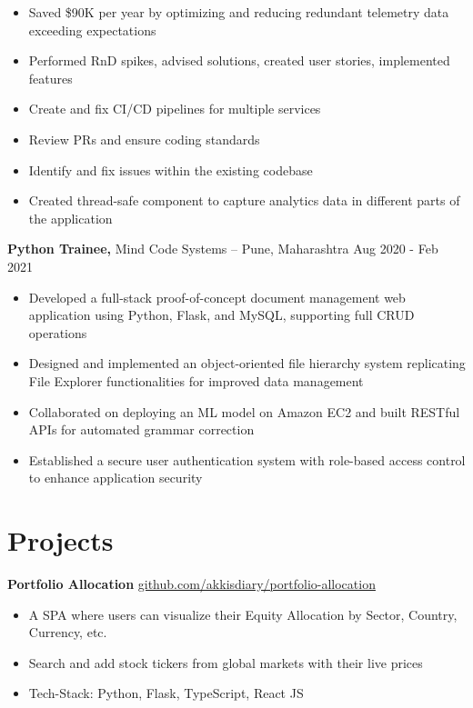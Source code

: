 \documentclass[11pt]{article}       %
\begin{document}
\begin{itemize}
  \item Saved \$90K per year by optimizing and reducing redundant telemetry data exceeding expectations \\
  \item Performed RnD spikes, advised solutions, created user stories, implemented features \\
  \item Create and fix CI/CD pipelines for multiple services \\
  \item Review PRs and ensure coding standards \\
  \item Identify and fix issues within the existing codebase \\
  \item Created thread-safe component to capture analytics data in different parts of the application \\
\end{itemize}

\textbf{Python Trainee,} {Mind Code Systems} -- Pune, Maharashtra \hfill Aug 2020 - Feb 2021 \\
\vspace{-9pt}
\begin{itemize}
  \item Developed a full-stack proof-of-concept document management web application using Python, Flask, and MySQL, supporting full CRUD operations
  \item Designed and implemented an object-oriented file hierarchy system replicating File Explorer functionalities for improved data management
  \item Collaborated on deploying an ML model on Amazon EC2 and built RESTful APIs for automated grammar correction
  \item Established a secure user authentication system with role-based access control to enhance application security
\end{itemize}

\vspace{-18.5pt}

\section*{Projects}
\textbf{Portfolio Allocation} \hfill \href{https://github.com/Akkisdiary/portfolio-allocation}{github.com/akkisdiary/portfolio-allocation} \\
\vspace{-9pt}
\begin{itemize}
  \item A SPA where users can visualize their Equity Allocation by Sector, Country, Currency, etc.
  \item Search and add stock tickers from global markets with their live prices
  \item Tech-Stack: Python, Flask, TypeScript, React JS
\end{itemize}
\end{document}
